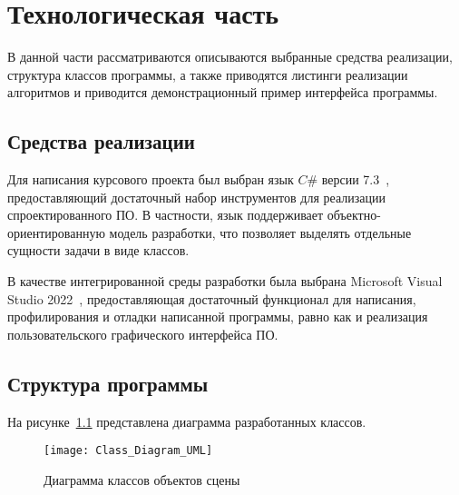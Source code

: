 \chapter{Технологическая часть}

В данной части рассматриваются описываются выбранные средства реализации, структура классов программы, а также приводятся листинги реализации алгоритмов и приводится демонстрационный пример интерфейса программы.

\section{Средства реализации}
Для написания курсового проекта был выбран язык $C\#$ версии 7.3~\cite{CSharp}, предоставляющий достаточный набор инструментов для реализации спроектированного ПО. В частности, язык поддерживает объектно-ориентированную модель разработки, что позволяет выделять отдельные сущности задачи в виде классов.

В качестве интегрированной среды разработки была выбрана Microsoft Visual Studio 2022~\cite{VS2022}, предоставляющая достаточный функционал для написания, профилирования и отладки написанной программы, равно как и реализация пользовательского графического интерфейса ПО.

\section{Структура программы}
На рисунке~\ref{fig:SceneObjects} представлена диаграмма разработанных классов.
\begin{figure}[H]
	\centering
	\texttt{[image: Class\_Diagram\_UML]}
	\caption{Диаграмма классов объектов сцены}
	\label{fig:SceneObjects}
\end{figure}

